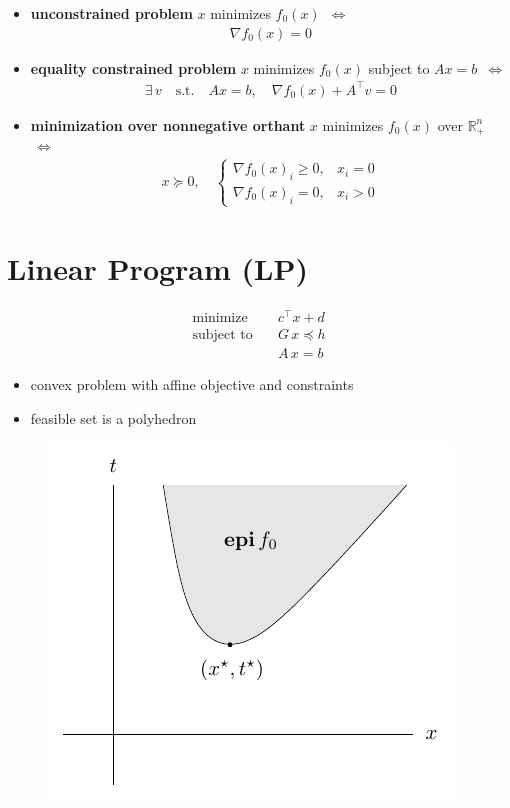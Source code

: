 \documentclass[11pt]{extarticle}
\newcommand{\ds}{\displaystyle}
\newcommand{\ifff}{\,\Longleftrightarrow\,}
\theoremstyle{definition}
\begin{document}
\begin{itemize}
  \item {\bf unconstrained problem} $x$ minimizes $f_0(x)$ $\ifff$ 
    \begin{align*}
      \nabla f_0(x) = 0
    \end{align*}
  \item {\bf equality constrained problem} $x$ minimizes $f_0(x)$ subject to $\ds Ax = b$ $\ifff$ 
    \begin{align*}
      \exists\,v\quad\text{s.t.}\quad A x = b, \quad\nabla f_0(x) + A^\top v = 0
    \end{align*}
  \item {\bf minimization over nonnegative orthant} $x$ minimizes $f_0(x)$ over $\mathbb{R}^n_{+}$ $\ifff$ 
    \begin{align*}
      x\succcurlyeq 0, \quad \begin{cases}\nabla f_0(x)_i\geqslant 0, & x_i = 0 \\ \nabla f_0(x)_i = 0, & x_i > 0 \end{cases}
    \end{align*}
\end{itemize}

\newpage

\section*{Linear Program (LP)}
\vspace{-1em}
\begin{align*}
  \text{minimize}\quad & c^\top x + d \\
  \text{subject to}\quad & G\,x\preccurlyeq h \\
  \qquad\qquad &A\,x = b
\end{align*}
\vspace{-2em}
\begin{itemize}
  \item convex problem with affine objective and constraints 
  \item feasible set is a polyhedron 
\end{itemize}
\vspace{-1em}
\begin{figure}[!htbp]
  \centering
  \includegraphics[scale=0.75,page=4]{fig/04.pdf}
\end{figure}
\end{document}
